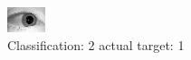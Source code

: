 \begin{figure}[h!]
\begin{center}
\includegraphics[width=0.60\columnwidth]{figures/ID1429_class_2_target_1.png}
\end{center}
\caption{ Classification: 2 actual target: 1}
\label{fig:ID1429_class_2_target_1}
\end{figure}

